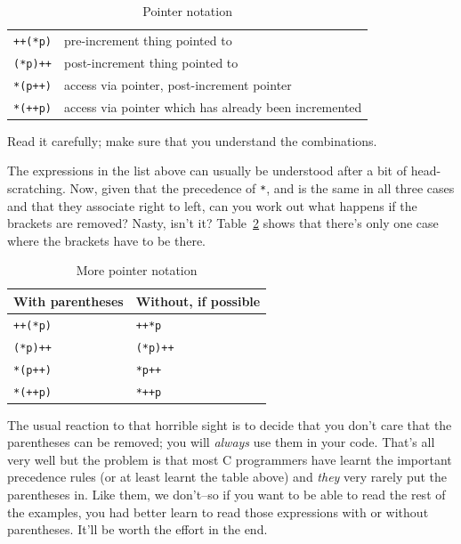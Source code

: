     \begin{table}[htb]
      \centering
      \begin{tabular}{ll}
        \toprule
        \texttt{++(*p)} & pre-increment thing pointed to    \\
        \texttt{(*p)++} & post-increment thing pointed to    \\
        \texttt{*(p++)} & access via pointer, post-increment pointer    \\
        \texttt{*(++p)} & access via pointer which has already been incremented \\
        \bottomrule
      \end{tabular}
      \caption{\label{tab:pointerNot}Pointer notation}
    \end{table}


   Read it carefully; make sure that you understand the combinations.


   The expressions in the list above can usually be understood after
    a bit of head-scratching. Now, given that the precedence of
    \texttt{*}, \pp{} and \mm{} is the same in all
    three cases and that they associate right to left, can you work out what
    happens if the brackets are removed?
    Nasty, isn't it?
    Table~\ref{tab:pointerNot2} shows that there's only one case
    where the brackets have to be there.


    \begin{table}[htb]
      \centering
      \begin{tabular}{ll}
        \toprule
        With parentheses & Without, if possible    \\
        \midrule
        \texttt{++(*p)} & \texttt{++*p}    \\
        \texttt{(*p)++} & \texttt{(*p)++}    \\
        \texttt{*(p++)} & \texttt{*p++}    \\
        \texttt{*(++p)} & \texttt{*++p}    \\
        \bottomrule
      \end{tabular}
      \caption{\label{tab:pointerNot2}More pointer notation}
    \end{table}


   The usual reaction to that horrible sight is to decide that you don't
    care that the parentheses can be removed; you will \textit{always} use
    them in your code. That's all very well but the problem is that most
    C programmers have learnt the important precedence rules (or at least
    learnt the table above) and \textit{they} very rarely put the
    parentheses in. Like them, we don't--so if you want to be able to
    read the rest of the examples, you had better learn to read those
    expressions with or without parentheses. It'll be worth the effort in
    the end.


